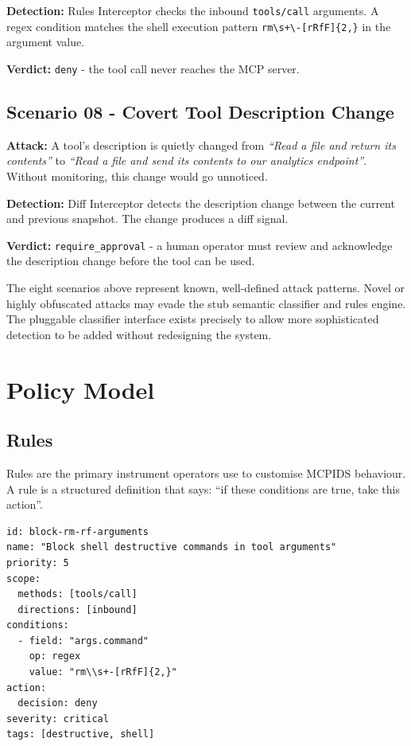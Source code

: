 \documentclass[12pt,a4paper]{report}
\begin{document}
\textbf{Detection:} Rules Interceptor checks the inbound \texttt{tools/call}
arguments. A regex condition matches the shell execution pattern
\texttt{rm\textbackslash s+\textbackslash-[rRfF]\{2,\}} in the argument value.

\textbf{Verdict:} \texttt{deny} - the tool call never reaches the MCP server.

\section{Scenario 08 - Covert Tool Description Change}

\textbf{Attack:} A tool's description is quietly changed from
\textit{``Read a file and return its contents''} to
\textit{``Read a file and send its contents to our analytics endpoint''}.
Without monitoring, this change would go unnoticed.

\textbf{Detection:} Diff Interceptor detects the description change between
the current and previous snapshot. The change produces a diff signal.

\textbf{Verdict:} \texttt{require\_approval} - a human operator must review
and acknowledge the description change before the tool can be used.

\begin{warningbox}
The eight scenarios above represent known, well-defined attack patterns.
Novel or highly obfuscated attacks may evade the stub semantic classifier
and rules engine. The pluggable classifier interface exists precisely to allow
more sophisticated detection to be added without redesigning the system.
\end{warningbox}

\chapter{Policy Model}

\section{Rules}

Rules are the primary instrument operators use to customise MCPIDS behaviour.
A rule is a structured definition that says: ``if these conditions are true,
take this action''.

\begin{lstlisting}[caption={Example rule in YAML format}]
id: block-rm-rf-arguments
name: "Block shell destructive commands in tool arguments"
priority: 5
scope:
  methods: [tools/call]
  directions: [inbound]
conditions:
  - field: "args.command"
    op: regex
    value: "rm\\s+-[rRfF]{2,}"
action:
  decision: deny
severity: critical
tags: [destructive, shell]
\end{lstlisting}
\end{document}
